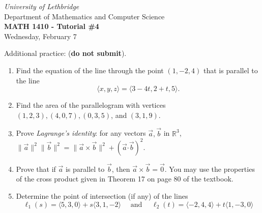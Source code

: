 \documentclass[12pt]{article}
\newcommand{\skipline}{\vspace{12pt}}
\newcommand{\len}[1]{\lVert #1\rVert}
\newcommand{\R}{\mathbb{R}}
\newcommand{\dotp}{\boldsymbol{\cdot}}
\begin{document}
\author{Instructor: Sean Fitzpatrick}
\thispagestyle{empty}
\begin{center}
\emph{University of Lethbridge}\\
Department of Mathematics and Computer Science\\
{\bf MATH 1410 - Tutorial \#4}\\
Wednesday, February 7
\end{center}
\skipline \skipline \skipline \noindent \skipline

\vspace*{\fill}




\bigskip

Additional practice: (\textbf{do not submit}).
\begin{enumerate}
\item Find the equation of the line through the point $(1,-2,4)$ that is parallel to the line
\[
\langle x,y,z\rangle = \langle 3-4t,2+t,5\rangle.
\]
\item Find the area of the parallelogram with vertices $(1,2,3), (4,0,7), (0,3,5)$, and $(3,1,9)$.
\item Prove \textit{Lagrange's identity}: for any vectors $\vec{a},\vec{b}$ in $\R^3$, $\len{\vec{a}}^2\len{\vec{b}}^2=\len{\vec{a}\times\vec{b}}^2 +(\vec{a}\dotp\vec{b})^2.$
\item Prove that if $\vec{a}$ is parallel to $\vec{b}$, then $\vec{a}\times\vec{b}=\vec{0}$. You may use the properties of the cross product given in Theorem 17 on page 80 of the textbook.
\item Determine the point of intersection (if any) of the lines
\[
\ell_1(s)  = \langle 5,3,0\rangle + s\langle 3,1,-2\rangle\quad\text{ and } \quad
\ell_2(t)  = \langle -2,4,4\rangle+t\langle 1,-3,0\rangle
\]
\end{enumerate}


\newpage
\end{document}
